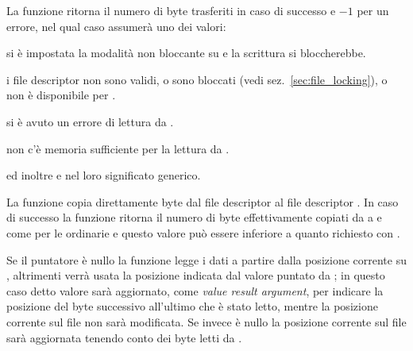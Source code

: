\begin{funcproto}{
}

{La funzione ritorna il numero di byte trasferiti in caso di successo e $-1$
  per un errore, nel qual caso  assumerà uno dei valori:
  \begin{errlist}
    \item[\errcode{EAGAIN}] si è impostata la modalità non bloccante su
       e la scrittura si bloccherebbe.
    \item[\errcode{EINVAL}] i file descriptor non sono validi, o sono bloccati
      (vedi sez.~\ref{sec:file_locking}), o  non è disponibile per
      .
    \item[\errcode{EIO}] si è avuto un errore di lettura da .
    \item[\errcode{ENOMEM}] non c'è memoria sufficiente per la lettura da
      .
  \end{errlist}
  ed inoltre  e  nel loro significato
  generico.}
\end{funcproto}

La funzione copia direttamente  byte dal file descriptor
 al file descriptor . In caso di successo la
funzione ritorna il numero di byte effettivamente copiati da  a
 e come per le ordinarie  e  questo
valore può essere inferiore a quanto richiesto con .

Se il puntatore  è nullo la funzione legge i dati a partire
dalla posizione corrente su , altrimenti verrà usata la
posizione indicata dal valore puntato da ; in questo caso detto
valore sarà aggiornato, come \textit{value result argument}, per indicare la
posizione del byte successivo all'ultimo che è stato letto, mentre la
posizione corrente sul file non sarà modificata. Se invece  è
nullo la posizione corrente sul file sarà aggiornata tenendo conto dei byte
letti da .

